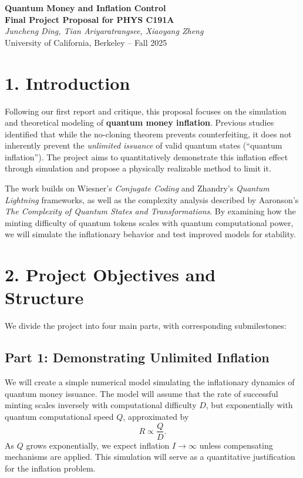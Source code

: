 \documentclass[a4paper,10.5pt,twoside]{article}
\begin{document}
\begin{center}
{\Large \textbf{Quantum Money and Inflation Control}} \\[6pt]
\textbf{Final Project Proposal for PHYS C191A}\\[3pt]
\textit{Juncheng Ding, Tian Ariyaratrangsee, Xiaoyang Zheng}\\[3pt]
University of California, Berkeley – Fall 2025
\end{center}

\section*{1. Introduction}

Following our first report and critique, this proposal focuses on the simulation and theoretical modeling of \textbf{quantum money inflation}. Previous studies identified that while the no-cloning theorem prevents counterfeiting, it does not inherently prevent the \textit{unlimited issuance} of valid quantum states (``quantum inflation''). The project aims to quantitatively demonstrate this inflation effect through simulation and propose a physically realizable method to limit it.

The work builds on Wiesner’s \textit{Conjugate Coding} and Zhandry’s \textit{Quantum Lightning} frameworks, as well as the complexity analysis described by Aaronson’s \textit{The Complexity of Quantum States and Transformations}. By examining how the minting difficulty of quantum tokens scales with quantum computational power, we will simulate the inflationary behavior and test improved models for stability.

\section*{2. Project Objectives and Structure}

We divide the project into four main parts, with corresponding submilestones:

\subsection*{Part 1: Demonstrating Unlimited Inflation}
We will create a simple numerical model simulating the inflationary dynamics of quantum money issuance. The model will assume that the rate of successful minting scales inversely with computational difficulty \( D \), but exponentially with quantum computational speed \( Q \), approximated by
\[
R \propto \frac{Q}{D}.
\]
As \( Q \) grows exponentially, we expect inflation \( I \to \infty \) unless compensating mechanisms are applied. This simulation will serve as a quantitative justification for the inflation problem.
\end{document}
